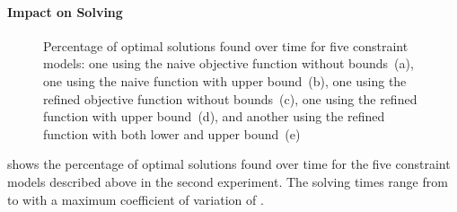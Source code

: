 \paragraph{Impact on Solving}

\begin{figure}
  \def\modelFont#1{{\small\figureFont#1}}
  \def\modelA{\modelFont{a}}
  \def\modelB{\modelFont{b}}
  \def\modelC{\modelFont{c}}
  \def\modelD{\modelFont{d}}
  \def\modelE{\modelFont{e}}

  \renewcommand{\plotPercentageFont}{\large}
  \renewcommand{\plotSecondsFont}{\large}
  \centering%

  \caption[%
            Plot for evaluating the different objective functions' impact on
            finding optimal solutions%
          ]%
          {%
            Percentage of optimal solutions found over time for five constraint
            models: one using the naive objective function without
            bounds~(\modelA), one using the naive function with upper
            bound~(\modelB), one using the refined objective function without
            bounds~(\modelC), one using the refined function with upper
            bound~(\modelD), and another using the refined function with both
            lower and upper bound~(\modelE)%
          }
\end{figure}



 shows the
percentage of optimal \glspl{solution} found over time for the five
\glspl{constraint model} described above in the second experiment.
%
The solving times range from
\printMinSolvingTime{
  \ObjFunRefinedVsNaiveOptProofsOverTimeNaiveNoBoundsSolvingTimeAvgMin,
  \ObjFunRefinedVsNaiveOptProofsOverTimeNaiveWUbSolvingTimeAvgMin,
  \ObjFunRefinedVsNaiveOptProofsOverTimeRefinedNoBoundsSolvingTimeAvgMin,
  \ObjFunRefinedVsNaiveOptProofsOverTimeRefinedWUbSolvingTimeAvgMin,
  \ObjFunRefinedVsNaiveOptProofsOverTimeRefinedWLbUbSolvingTimeAvgMin
} to
\printMaxSolvingTime{
  \ObjFunRefinedVsNaiveOptProofsOverTimeNaiveNoBoundsSolvingTimeAvgMax,
  \ObjFunRefinedVsNaiveOptProofsOverTimeNaiveWUbSolvingTimeAvgMax,
  \ObjFunRefinedVsNaiveOptProofsOverTimeRefinedNoBoundsSolvingTimeAvgMax,
  \ObjFunRefinedVsNaiveOptProofsOverTimeRefinedWUbSolvingTimeAvgMax,
  \ObjFunRefinedVsNaiveOptProofsOverTimeRefinedWLbUbSolvingTimeAvgMax
} with a maximum coefficient of variation of
\numMaxOf{
  \ObjFunRefinedVsNaiveOptProofsOverTimeNaiveNoBoundsSolvingTimeCvMax,
  \ObjFunRefinedVsNaiveOptProofsOverTimeNaiveWUbSolvingTimeCvMax,
  \ObjFunRefinedVsNaiveOptProofsOverTimeRefinedNoBoundsSolvingTimeCvMax,
  \ObjFunRefinedVsNaiveOptProofsOverTimeRefinedWUbSolvingTimeCvMax,
  \ObjFunRefinedVsNaiveOptProofsOverTimeRefinedWLbUbSolvingTimeCvMax
}.

